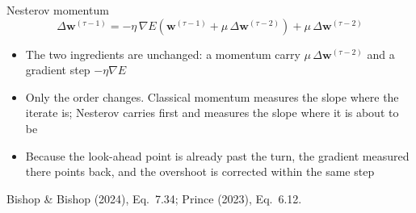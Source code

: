 \documentclass[aspectratio=169, 11pt]{beamer}
\newcommand{\srcline}[1]{%
  \par\vspace{0.25em}%
  {\scriptsize\color{mcMuted}\hfill #1\par}}
\begin{document}
\begin{frame}{Nesterov momentum}
  \vspace{-0.9em}
  \[
    \Delta \mathbf{w}^{(\tau-1)}
      = -\eta\,\nabla E\!\left(\mathbf{w}^{(\tau-1)}
                              + \mu\,\Delta \mathbf{w}^{(\tau-2)}\right)
        + \mu\,\Delta \mathbf{w}^{(\tau-2)}
  \]
  \vspace{-0.2em}
  \begin{itemize}\itemsep0.4em
    \item The two ingredients are unchanged: a momentum carry
          $\mu\,\Delta \mathbf{w}^{(\tau-2)}$ and a gradient step $-\eta\nabla E$
    \item Only the \alert{order} changes. Classical momentum measures
          the slope where the iterate is; Nesterov carries first and
          measures the slope where it is about to be
    \item Because the look-ahead point is already past the turn, the
          gradient measured there points back, and the overshoot is
          corrected within the same step
  \end{itemize}
  \srcline{Bishop \& Bishop (2024), Eq.~7.34; Prince (2023), Eq.~6.12.}
\end{frame}
\end{document}

